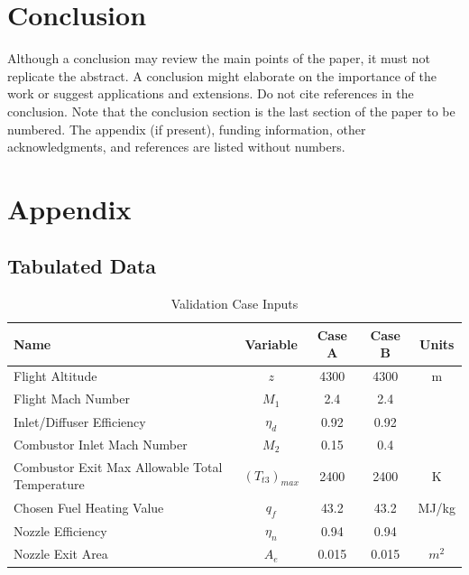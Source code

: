 \documentclass[conf]{new-aiaa} %
\begin{document}
\section{Conclusion}
Although a conclusion may review the main points of the paper, it must not replicate the abstract. A conclusion might elaborate on the importance of the work or suggest applications and extensions. Do not cite references in the conclusion. Note that the conclusion section is the last section of the paper to be numbered. The appendix (if present), funding information, other acknowledgments, and references are listed without numbers.


\section*{Appendix}
\subsection{Tabulated Data}
\begin{table}[hbt!] %
    \caption{\label{tab:val_case_input} Validation Case Inputs}
    \centering
    \begin{tabular}{lcccc}
        \hline
        Name& Variable& Case A& Case B& Units\\\hline
        Flight Altitude& $z$& 4300& 4300& m\\
        Flight Mach Number& $M_1$& 2.4& 2.4\\
        Inlet/Diffuser Efficiency& $\eta_d$& 0.92& 0.92\\
        Combustor Inlet Mach Number& $M_2$& 0.15& 0.4\\
        Combustor Exit Max Allowable Total Temperature& $(T_{t3})_{max}$& 2400& 2400& K\\
        Chosen Fuel Heating Value& $q_f$& 43.2& 43.2& MJ/kg\\
        Nozzle Efficiency& $\eta_n$& 0.94& 0.94\\
        Nozzle Exit Area& $A_e$& 0.015& 0.015& $m^2$\\
        \hline
    \end{tabular}
\end{table}
\end{document}
